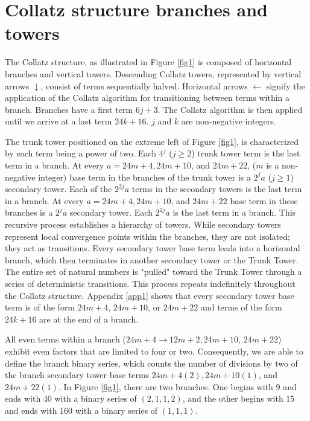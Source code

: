 \documentclass[sn-mathphys-num, pdflatex]{sn-jnl}
\begin{document}
\section{Collatz structure branches and towers}\label{sec2}
The Collatz structure, as illustrated in Figure \ref{fig1} is composed of horizontal branches and vertical towers. Descending Collatz towers, represented by vertical arrows $\downarrow$, consist of terms sequentially halved. Horizontal arrows $\leftarrow$ signify the application of the Collatz algorithm for transitioning between terms within a branch.  Branches have a first term $6j+3$. The Collatz algorithm is then applied until we arrive at a last term $24k+16$.  $j$ and $k$ are non-negative integers.

The trunk tower positioned on the extreme left of Figure \ref{fig1}, is characterized by each term being a power of two. Each $4^j$ ($j \ge 2$) trunk tower term is the last term in a branch. At every $a=24m+4, 24m+10$, and $24m+22$, ($m$ is a non-negative integer) base term in the branches of the trunk tower is a $2^ja$ ($j \ge 1$) secondary tower. Each of the $2^{2j}a$ terms in the secondary towers is the last term in a branch. At every $a=24m+4, 24m+10$, and $24m+22$ base term in these branches is a $2^ja$ secondary tower. Each $2^{2j}a$ is the last term in a branch. This recursive process establishes a hierarchy of towers. While secondary towers represent local convergence points within the branches, they are not isolated; they act as transitions. Every secondary tower base term leads into a horizontal branch, which then terminates in another secondary tower or the Trunk Tower. The entire set of natural numbers is "pulled" toward the Trunk Tower through a series of deterministic transitions. This process repeats indefinitely throughout the Collatz structure. Appendix \ref{app1} shows that every secondary tower base term is of the form $24m+4$, $24m+10$, or $24m+22$ and terms of the form $24k+16$ are at the end of a branch.

All even terms within a branch ($24m+4 \to 12m+2, 24m+10$, $24m+22$) exhibit even factors that are limited to four or two. Consequently, we are able to define the branch binary series, which counts the number of divisions by two of the branch secondary tower base terms $24m+4 (2), 24m+10 (1)$, and $24m+22 (1)$. In Figure \ref{fig1}, there are two branches. One begins with 9 and ends with 40 with a binary series of $(2,1,1,2)$, and the other begins with 15 and ends with 160 with a binary series of $(1,1,1)$.
\end{document}
